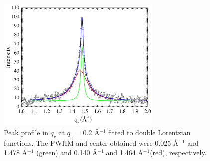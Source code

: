 \begin{figure}[htbp]
  \centering
  \includegraphics[width=0.7\textwidth]{figures/ripple/nGIWAXS/strong_peak_Lorentz}
  \caption[Peak profile in $q_r$ at $q_z$ = 0.2 \AA$^{-1}$ 
  fitted to double Lorentzian functions]{Peak profile in $q_r$ at $q_z$ = 0.2 \AA$^{-1}$ 
  fitted to double Lorentzian functions. The FWHM and center obtained 
  were 0.025 \AA$^{-1}$ and 1.478 \AA$^{-1}$ (green) and 0.140 \AA$^{-1}$ 
  and 1.464 \AA$^{-1}$(red), respectively.}
  \label{fig:strong_peak}
\end{figure}

